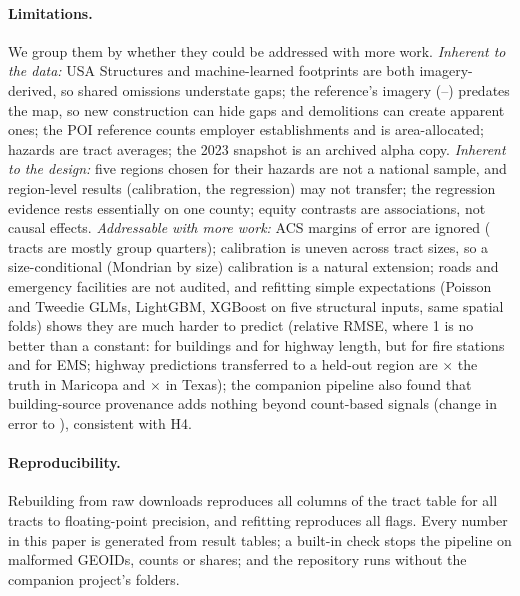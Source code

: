 \documentclass[11pt]{article}
\begin{document}
\paragraph{Limitations.} We group them by whether they could be addressed with more work.
\emph{Inherent to the data:} USA Structures and machine-learned footprints are both imagery-derived, so shared omissions understate gaps; the reference's imagery (\MgImgFirst{}--\MgImgLast{}) predates the map, so new construction can hide gaps and demolitions can create apparent ones; the POI reference counts employer establishments and is area-allocated; hazards are tract averages; the 2023 snapshot is an archived alpha copy.
\emph{Inherent to the design:} five regions chosen for their hazards are not a national sample, and region-level results (calibration, the regression) may not transfer; the regression evidence rests essentially on one county; equity contrasts are associations, not causal effects.
\emph{Addressable with more work:} ACS margins of error are ignored (\MgGqTracts{} tracts are mostly group quarters); calibration is uneven across tract sizes, so a size-conditional (Mondrian by size) calibration is a natural extension; roads and emergency facilities are not audited, and refitting simple expectations (Poisson and Tweedie GLMs, LightGBM, XGBoost on five structural inputs, same spatial folds) shows they are much harder to predict (relative RMSE, where 1 is no better than a constant: \MgRrmseBldg{} for buildings and \MgRrmseHwy{} for highway length, but \MgRrmseFire{} for fire stations and \MgRrmseEms{} for EMS; highway predictions transferred to a held-out region are \MgHwyLoroAz{}$\times$ the truth in Maricopa and \MgHwyLoroTx{}$\times$ in Texas); the companion pipeline also found that building-source provenance adds nothing beyond count-based signals (change in error \MgProvMaeMin{} to \MgProvMaeMax{}), consistent with H4.

\paragraph{Reproducibility.} Rebuilding from raw downloads reproduces all \MgReproCols{} columns of the tract table for all \NTracts{} tracts to floating-point precision, and refitting reproduces all \MgReproFlags{} flags. Every number in this paper is generated from result tables; a built-in check stops the pipeline on malformed GEOIDs, counts or shares; and the repository runs without the companion project's folders.
\end{document}
